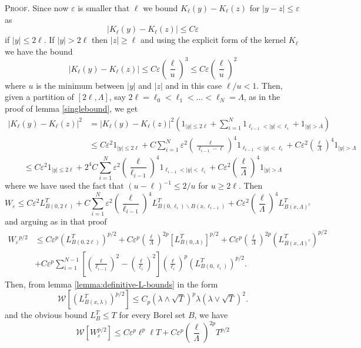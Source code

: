 \documentclass[a4paper,12pt]{article}
\begin{document}
\textsc{Proof.}\hspace{0.3cm} Since now $\varepsilon$ is smaller that $\ell$
we bound $K_{\ell}(y)-K_{\ell}(z)$ for $|y-z|\leq\varepsilon$ as
\[
|K_{\ell}(y)-K_{\ell}(z)|\leq C\varepsilon
\]
if $|y|\leq2\ell$. If $|y|>2\ell$ then $|z|\geq\ell$ and using the explicit
form of the kernel $K_{\ell}$ we have the bound
\[
|K_{\ell}(y)-K_{\ell}(z)|\leq C\varepsilon\left(  \frac{\ell}{u}\right)
^{3}\leq C\varepsilon\left(  \frac{\ell}{u}\right)  ^{2}%
\]
where $u$ is the minimum between $|y|$ and $|z|$ and in this case $\ell/u<1$.
Then, given a partition of $\left[  2\ell,\Lambda\right]  $, say $2\ell
=\ell_{0}<\ell_{1}<...<\ell_{N}=\Lambda$, as in the proof of lemma
\ref{singlebound}, we get
\begin{align*}
\left|  K_{\ell}(y)-K_{\ell}(z)\right|  ^{2}  &  =\left|  K_{\ell}(y)-K_{\ell
}(z)\right|  ^{2}\left(  1_{|y|\leq2\ell}+\sum_{i=1}^{N}1_{\ell_{i-1}%
<|y|<\ell_{i}}+1_{|y|>\Lambda}\right) \\
&  \leq C\varepsilon^{2}1_{|y|\leq2\ell}+C\sum_{i=1}^{N}\varepsilon^{2}\left(
\frac{\ell}{\ell_{i-1}-\ell}\right)  ^{4}1_{\ell_{i-1}<|y|<\ell_{i}%
}+C\varepsilon^{2}\left(  \frac{\ell}{\Lambda}\right)  ^{4}1_{|y|>\Lambda}%
\end{align*}%
\[
\leq C\varepsilon^{2}1_{|y|\leq2\ell}+2^{4}C\sum_{i=1}^{N}\varepsilon
^{2}\left(  \frac{\ell}{\ell_{i-1}}\right)  ^{4}1_{\ell_{i-1}<|y|<\ell_{i}%
}+C\varepsilon^{2}\left(  \frac{\ell}{\Lambda}\right)  ^{4}1_{|y|>\Lambda}%
\]
where we have used the fact that $(u-\ell)^{-1}\leq{2}/{u}$ for $u\geq2\ell$.
Then
\[
W_{\varepsilon}\leq C\varepsilon^{2}L_{B(0,2\ell)}^{T}+C\sum_{i=1}%
^{N}\varepsilon^{2}\left(  \frac{\ell}{\ell_{i-1}}\right)  ^{4}L_{B(0,\ell
_{i})\backslash B(x,\ell_{i-1})}^{T}+C\varepsilon^{2}\left(  \frac{\ell
}{\Lambda}\right)  ^{4}L_{B(x,\Lambda)^{c}}^{T}%
\]
and arguing as in that proof
\begin{align*}
W_{\varepsilon}{}^{p/2}  &  \leq C\varepsilon^{p}(L_{B(0,2\ell)}^{T}%
)^{p/2}+C\varepsilon^{p}\left(  \frac{\ell}{\Lambda}\right)  ^{2p}%
[L_{B(0,\Lambda)}^{T}]^{p/2}+C\varepsilon^{p}\left(  \frac{\ell}{\Lambda
}\right)  ^{2p}\left(  L_{B(x,\Lambda)^{c}}^{T}\right)  ^{p/2}\\
&  +C\varepsilon^{p}\sum_{i=1}^{N-1}\left[  \left(  \frac{\ell}{\ell_{i-1}%
}\right)  ^{2}-\left(  \frac{\ell}{\ell_{i}}\right)  ^{2}\right]  \left(
\frac{\ell}{\ell_{i}}\right)  ^{p}(L_{B(0,\ell_{i})}^{T})^{p/2}.
\end{align*}
Then, from lemma \ref{lemma:definitive-L-bounds} in the form
\[
\mathcal{W}\left[  \left(  L_{B(x,\lambda)}^{T}\right)  ^{p/2}\right]  \leq
C_{p}(\lambda\wedge\sqrt{T})^{p}\lambda(\lambda\vee\sqrt{T})^{2}.
\]
and the obvious bound $L_{B}^{T}\leq T$ for every Borel set $B$, we have
\[
\mathcal{W}\left[  W_{\varepsilon}^{p/2}\right]  \leq C\varepsilon^{p}\ell
^{p}\ell T+C\varepsilon^{p}\left(  \frac{\ell}{\Lambda}\right)  ^{2p}T^{p/2}%
\]%
\end{document}
